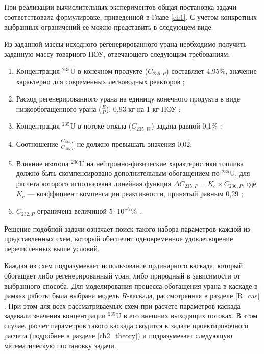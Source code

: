 При реализации вычислительных экспериментов общая постановка задачи соответствовала формулировке, приведенной в Главе \ref{ch1}. С учетом конкретных выбранных ограничений ее можно представить в следующем виде.

Из заданной массы исходного регенерированного урана необходимо получить заданную массу товарного НОУ, отвечающего следующим требованиям:

\begin{enumerate}
  \item Концентрация $^{235}$U в конечном продукте ($C_{235,P}$) составляет 4,95\%, значение характерно для современных легководных реакторов \cite{solovevaCennostiOYaTKak2019};
  \item Расход регенерированного урана на единицу конечного продукта в виде низкообогащенного урана ($\frac{E}{P}$): 0,93 кг на 1 кг НОУ \cite{smirnovApplyingEnrichmentCapacities2018};
  \item Концентрация $^{235}$U в потоке отвала ($C_{235,W}$) задана равной 0,1\% \cite{smirnovEvolutionIsotopicComposition2012};
  \item Соотношение $\frac{C_{234,P}}{C_{235,P}}$ не должно превышать значения 0,02;
  \item Влияние изотопа $^{236}$U на нейтронно-физические характеристики топлива должно быть скомпенсировано дополнительным обогащением по $^{235}$U, для расчета которого использована линейная функция $\Delta C_{235,P}=K_{c}\times C_{236,P}$, где $K_{c}$ --- коэффициент компенсации реактивности, принятый равным 0,29 \cite{smirnovApplyingEnrichmentCapacities2018};
  \item $C_{232,P}$ ограничена величиной $5\cdot10^{-7}$\% \cite{smirnovApplyingEnrichmentCapacities2018,smirnovAnalysisEffectRestrictions2021}.
\end{enumerate}

Решение подобной задачи означает поиск такого набора параметров каждой из представленных схем, который обеспечит одновременное удовлетворение перечисленных выше условий. 

Каждая из схем подразумевает использование ординарного каскада, который обогащает либо регенерированный уран, либо природный в зависимости от выбранного способа. Для моделирования процесса обогащения урана в каскаде в рамках работы была выбрана модель $R$-каскада, рассмотренная в разделе \ref{R_cas} \cite{sulaberidzeTeoriyaKaskadovDlya2011}. При этом для всех рассматриваемых схем при расчете параметров каскада задавали значения концентрации $^{235}$U в его внешних выходящих потоках. В этом случае, расчет параметров такого каскада сводится к задаче проектировочного расчета (подробнее в разделе \ref{ch2_theory}) и подразумевает следующую математическую постановку задачи. 

